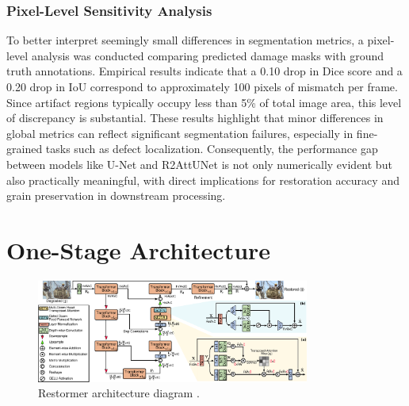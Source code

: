 \documentclass[10pt,a4paper,twocolumn,twoside]{article}
\begin{document}
\subsubsection{Pixel-Level Sensitivity Analysis}
To better interpret seemingly small differences in segmentation metrics, a pixel-level analysis was conducted comparing predicted damage masks with ground truth annotations. Empirical results indicate that a 0.10 drop in Dice score and a 0.20 drop in IoU correspond to approximately 100 pixels of mismatch per frame. Since artifact regions typically occupy less than 5\% of total image area, this level of discrepancy is substantial. These results highlight that minor differences in global metrics can reflect significant segmentation failures, especially in fine-grained tasks such as defect localization. Consequently, the performance gap between models like U-Net and R2AttUNet is not only numerically evident but also practically meaningful, with direct implications for restoration accuracy and grain preservation in downstream processing.
\section{One-Stage Architecture}
\begin{figure}[t]
    \centering
    \includegraphics[width= 0.8\textwidth]{img/architecture.pdf}\vspace{-0.6em}
    \caption{Restormer architecture diagram \cite{restormer}. }
    \label{fig:framework}
    \vspace{-1em}
\end{figure}
\end{document}
